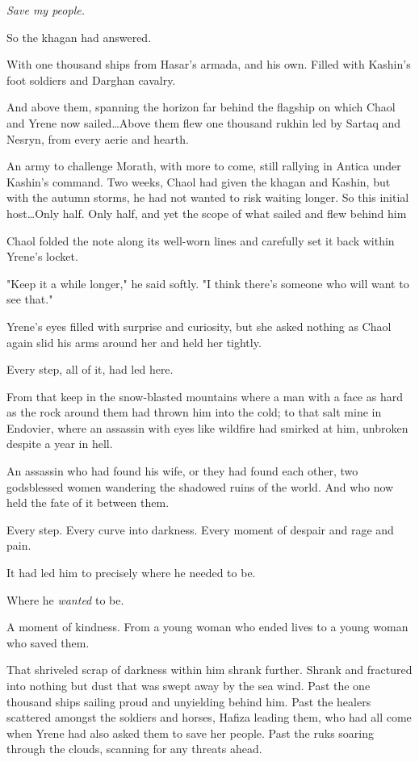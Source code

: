 \emph{Save my people.}

So the khagan had answered.

With one thousand ships from Hasar's armada, and his own.
Filled with Kashin's foot soldiers and Darghan cavalry.

And above them, spanning the horizon far behind the flagship on which Chaol and Yrene now sailed\ldots Above them flew one thousand rukhin led by Sartaq and Nesryn, from every aerie and hearth.

An army to challenge Morath, with more to come, still rallying in Antica under Kashin's command.
Two weeks, Chaol had given the khagan and Kashin, but with the autumn storms, he had not wanted to risk waiting longer.
So this initial host\ldots Only half.
Only half, and yet the scope of what sailed and flew behind him 

Chaol folded the note along its well-worn lines and carefully set it back within Yrene's locket.

"Keep it a while longer," he said softly.
"I think there's someone who will want to see that."

Yrene's eyes filled with surprise and curiosity, but she asked nothing as Chaol again slid his arms around her and held her tightly.

Every step, all of it, had led here.

From that keep in the snow-blasted mountains where a man with a face as hard as the rock around them had thrown him into the cold; to that salt mine in Endovier, where an assassin with eyes like wildfire had smirked at him, unbroken despite a year in hell.

An assassin who had found his wife, or they had found each other, two godsblessed women wandering the shadowed ruins of the world.
And who now held the fate of it between them.

Every step.
Every curve into darkness.
Every moment of despair and rage and pain.

It had led him to precisely where he needed to be.

Where he \emph{wanted} to be.

A moment of kindness.
From a young woman who ended lives to a young woman who saved them.

That shriveled scrap of darkness within him shrank further.
Shrank and fractured into nothing but dust that was swept away by the sea wind.
Past the one thousand ships sailing proud and unyielding behind him.
Past the healers scattered amongst the soldiers and horses, Hafiza leading them, who had all come when Yrene had also asked them to save her people.
Past the ruks soaring through the clouds, scanning for any threats ahead.


